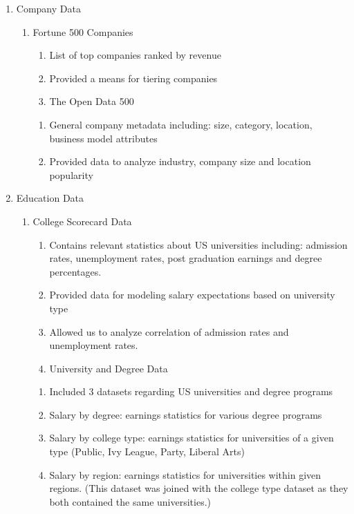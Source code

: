 \begin{enumerate}
	\item Company Data
	\begin{enumerate}
		\item Fortune 500 Companies \cite{fortune500}
		\begin{enumerate}
			\item List of top companies ranked by revenue
			\item Provided a means for tiering companies 
			\item The Open Data 500 \cite{kaggleCompanies}
		\end{enumerate}
		\begin{enumerate}
			\item General company metadata including: size, category, location, business model attributes 
			\item Provided data to analyze industry, company size and location popularity
		\end{enumerate}
	\end{enumerate}
	\item Education Data
	\begin{enumerate}
	\item College Scorecard Data \cite{collegeScorecard}
		\begin{enumerate}
			\item Contains relevant statistics about US universities including: admission rates, unemployment rates, post graduation earnings and degree percentages.
			\item Provided data for modeling salary expectations based on university type
			\item Allowed us to analyze correlation of admission rates and unemployment rates.
			\item University and Degree Data \cite{kaggleCollege}
		\end{enumerate}
		\begin{enumerate}
			\item Included 3 datasets regarding US universities and degree programs
			\item Salary by degree: earnings statistics for various degree programs 
			\item Salary by college type: earnings statistics for universities of a given type (Public, Ivy League, Party, Liberal Arts)
			\item Salary by region: earnings statistics for universities within given regions. (This dataset was joined with the college type dataset as they both contained the same universities.)
		\end{enumerate}

\end{enumerate}
\end{enumerate}
